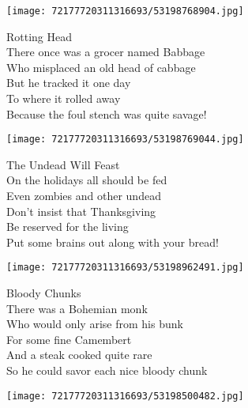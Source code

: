\documentclass[10pt,letterpaper]{article}
\begin{document}
\begin{center}
\texttt{[image: 72177720311316693/53198768904.jpg]}
\end{center}

\begin{center}
Rotting Head\\
\vskip 0.2in
There once was a grocer named Babbage\\
Who misplaced an old head of cabbage\\
But he tracked it one day\\
To where it rolled away\\
Because the foul stench was quite savage!\\
\end{center}
\pagebreak

\begin{center}\texttt{[image: 72177720311316693/53198769044.jpg]}
\end{center}
\begin{center}
The Undead Will Feast\\
\vskip 0.2in
On the holidays all should be fed\\
Even zombies and other undead\\
Don't insist that Thanksgiving\\
Be reserved for the living\\
Put some brains out along with your bread!\\
\end{center}
\pagebreak

\begin{center}\texttt{[image: 72177720311316693/53198962491.jpg]}
\end{center}
\begin{center}
Bloody Chunks\\
\vskip 0.2in
There was a Bohemian monk\\
Who would only arise from his bunk\\
For some fine Camembert\\
And a steak cooked quite rare\\
So he could savor each nice bloody chunk\\
\end{center}
\pagebreak

\begin{center}
\texttt{[image: 72177720311316693/53198500482.jpg]}
\end{center}
\end{document}
